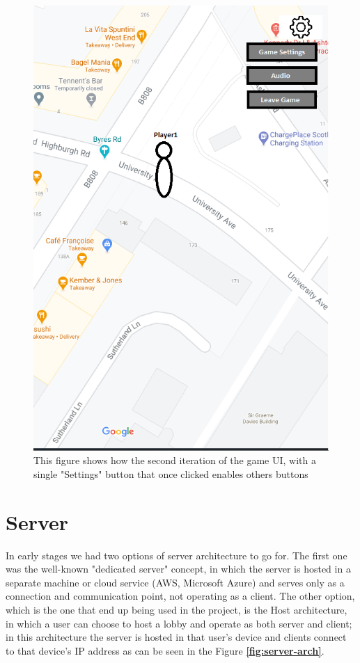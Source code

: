 \documentclass{dissertation}
\begin{document}
\begin{figure}[H]
\centering
\includegraphics[width = .6\linewidth]{images/game-ui2.png}
\caption{This figure shows how the second iteration of the game UI, with a single "Settings" button that once clicked enables others buttons}
\label{fig:game-ui2}
\end{figure}

\section{Server} 

In early stages we had two options of server architecture to go for. The first one was the well-known "dedicated server" concept, in which the server is hosted in a separate machine or cloud service (AWS, Microsoft Azure) and serves only as a connection and communication point, not operating as a client. The other option, which is the one that end up being used in the project, is the Host architecture, in which a user can choose to host a lobby and operate as both server and client; in this architecture the server is hosted in that user's device and clients connect to that device's IP address as can be seen in the Figure \textbf{\ref{fig:server-arch}}.
\end{document}
